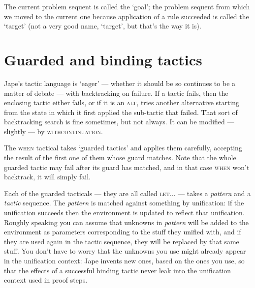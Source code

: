 The current problem sequent is called the `goal'; the problem sequent from which we moved to the current one because application of a rule succeeded is called the `target' (not a very good name, `target', but that's the way it is).


\section{Guarded and binding tactics}


Jape's tactic language is `eager' --- whether it should be so continues to be a matter of debate --- with backtracking on failure. If a tactic fails, then the enclosing tactic either fails, or if it is an \textsc{alt}, tries another alternative starting from the state in which it first applied the sub-tactic that failed. That sort of backtracking search is fine sometimes, but not always. It can be modified --- slightly --- by \textsc{withcontinuation}.


The \textsc{when} tactical takes `guarded tactics' and applies them carefully, accepting the result of the first one of them whose guard matches. Note that the whole guarded tactic may fail after its guard has matched, and in that case \textsc{when} won't backtrack, it will simply fail.


Each of the guarded tacticals --- they are all called \textsc{let...} --- takes a \textit{pattern} and a \textit{tactic} sequence. The \textit{pattern} is matched against something by unification: if the unification succeeds then the environment is updated to reflect that unification. Roughly speaking you can assume that unknowns in \textit{pattern} will be added to the environment as parameters corresponding to the stuff they unified with, and if they are used again in the tactic sequence, they will be replaced by that same stuff. You don't have to worry that the unknowns you use might already appear in the unification context: Jape invents new ones, based on the ones you use, so that the effects of a successful binding tactic never leak into the unification context used in proof steps.

 